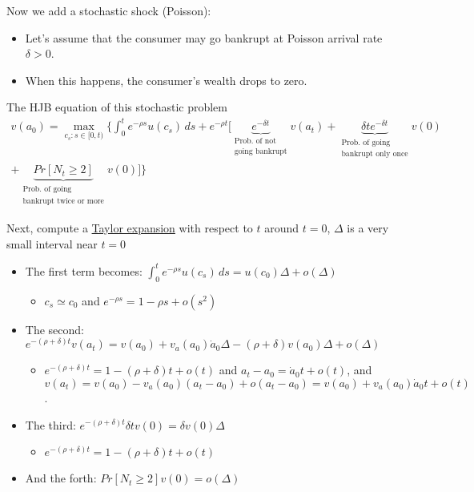 Now we add a stochastic shock (Poisson): \begin{itemize}
    \item Let's assume that the consumer may go bankrupt at Poisson arrival rate $\delta > 0$.
    \item When this happens, the consumer’s wealth drops to zero.
\end{itemize}
The HJB equation of this stochastic problem \begin{align*}
    v(a_0) = \max_{c_s: s \in [0,t)} \{\int_{0}^{t} e^{-\rho s}u(c_s) \, ds
    + e^{-\rho t} \Big[
    \underbrace{e^{-\delta t}}_{\substack{\text{Prob. of not}              \\ \text{going bankrupt}}}v(a_t)
    + \underbrace{\delta t e^{-\delta t}}_{\substack{\text{Prob. of going} \\ \text{bankrupt only once}}}v(0) \\
    + \underbrace{Pr[N_t \geq 2]}_{\substack{\text{Prob. of going}         \\ \text{bankrupt twice or more}}}v(0)\Big]\}
\end{align*}

Next, compute a \underline{Taylor expansion} with respect to $t$ around $t = 0$, $\Delta$ is a very small interval near $t=0$ \begin{itemize}
    \item The first term becomes: $\int_{0}^{t} e^{-\rho s} u(c_s) \, ds = u(c_0)\Delta + o(\Delta)$ \begin{itemize}
              \item $c_s \simeq c_0$ and $e^{-\rho s} = 1 - \rho s + o(s^2)$
          \end{itemize}
    \item The second: $e^{-(\rho + \delta)t}v(a_t) = v(a_0) + v_a(a_0)\dot{a}_0\Delta - (\rho+\delta)v(a_0)\Delta + o(\Delta)$ \begin{itemize}
              \item $e^{-(\rho + \delta)t} = 1 - (\rho + \delta)t + o(t)$ and $a_t-a_0 = \dot{a}_0t + o(t)$, and $v(a_t) = v(a_0) - v_a(a_0)(a_t-a_0) + o(a_t - a_0) = v(a_0) + v_a(a_0)\dot{a}_0t+o(t)$.
          \end{itemize}
    \item The third: $e^{-(\rho+\delta)t}\delta t v(0) = \delta v(0)\Delta$ \begin{itemize}
              \item $e^{-(\rho + \delta)t} = 1 - (\rho + \delta)t + o(t)$
          \end{itemize}
    \item And the forth: $Pr[N_t \geq 2]v(0) = o(\Delta)$
\end{itemize}

